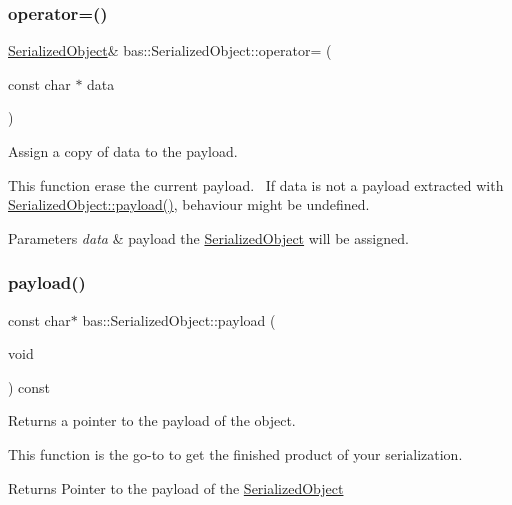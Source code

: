 \subsubsection{\texorpdfstring{operator=()}{operator=()}\hspace{0.1cm}{\footnotesize\ttfamily [2/2]}}
{\footnotesize\ttfamily \mbox{\hyperlink{classbas_1_1SerializedObject}{Serialized\+Object}}\& bas\+::\+Serialized\+Object\+::operator= (\begin{DoxyParamCaption}\item[{const char $\ast$}]{data }\end{DoxyParamCaption})\hspace{0.3cm}{\ttfamily [inline]}}



Assign a copy of data to the payload. 

This function erase the current payload.~\newline
If data is not a payload extracted with \mbox{\hyperlink{classbas_1_1SerializedObject_a975760dac48a3c581e5e3632f6781856}{Serialized\+Object\+::payload()}}, behaviour might be undefined. 
\begin{DoxyParams}{Parameters}
{\em data} & payload the \mbox{\hyperlink{classbas_1_1SerializedObject}{Serialized\+Object}} will be assigned. \\
\hline
\end{DoxyParams}
\mbox{\label{classbas_1_1SerializedObject_a975760dac48a3c581e5e3632f6781856}} 
\subsubsection{\texorpdfstring{payload()}{payload()}}
{\footnotesize\ttfamily const char$\ast$ bas\+::\+Serialized\+Object\+::payload (\begin{DoxyParamCaption}\item[{void}]{ }\end{DoxyParamCaption}) const\hspace{0.3cm}{\ttfamily [inline]}}



Returns a pointer to the payload of the object. 

This function is the go-\/to to get the \textquotesingle{}finished product\textquotesingle{} of your serialization. \begin{DoxyReturn}{Returns}
Pointer to the payload of the \mbox{\hyperlink{classbas_1_1SerializedObject}{Serialized\+Object}} 
\end{DoxyReturn}
\mbox{\label{classbas_1_1SerializedObject_aad2a332aaecd0fba8eac2bf06b60d5df}} 
